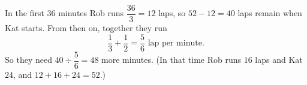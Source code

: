 In the first $36$ minutes Rob runs $\dfrac{36}{3}=12$ laps, so $52-12=40$ laps remain when Kat starts. From then on, together they run
\[
\dfrac{1}{3}+\dfrac{1}{2}=\dfrac{5}{6}\text{ lap per minute}.
\]
So they need $40\div\dfrac{5}{6}=\boxed{48}$ more minutes. (In that time Rob runs $16$ laps and Kat $24$, and $12+16+24=52$.)
